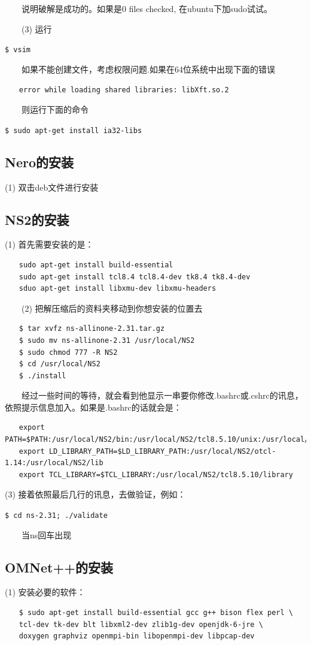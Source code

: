 　　说明破解是成功的。如果是0 files checked,  在ubuntu下加sudo试试。

　　(3) 运行

\verb"$ vsim"

　　如果不能创建文件，考虑权限问题.如果在64位系统中出现下面的错误

\verb"　　error while loading shared libraries: libXft.so.2"

　　则运行下面的命令

\verb"$ sudo apt-get install ia32-libs"

\subsection{Nero的安装}

(1) 双击deb文件进行安装

\subsection{NS2的安装}
(1) 首先需要安装的是：
\begin{verbatim}
　　sudo apt-get install build-essential
　　sudo apt-get install tcl8.4 tcl8.4-dev tk8.4 tk8.4-dev
　　sduo apt-get install libxmu-dev libxmu-headers
\end{verbatim}

　　(2) 把解压缩后的资料夹移动到你想安装的位置去
\begin{verbatim}
　　$ tar xvfz ns-allinone-2.31.tar.gz
　　$ sudo mv ns-allinone-2.31 /usr/local/NS2
　　$ sudo chmod 777 -R NS2
　　$ cd /usr/local/NS2
　　$ ./install
\end{verbatim}

　　经过一些时间的等待，就会看到他显示一串要你修改.bashrc或.cshrc的讯息，依照提示信息加入。如果是.bashrc的话就会是：
\begin{verbatim}
　　export PATH=$PATH:/usr/local/NS2/bin:/usr/local/NS2/tcl8.5.10/unix:/usr/local/NS2/tk8.5.10/unix
　　export LD_LIBRARY_PATH=$LD_LIBRARY_PATH:/usr/local/NS2/otcl-1.14:/usr/local/NS2/lib
　　export TCL_LIBRARY=$TCL_LIBRARY:/usr/local/NS2/tcl8.5.10/library
\end{verbatim}

(3) 接着依照最后几行的讯息，去做验证，例如：

\verb"$ cd ns-2.31; ./validate"

　　当ns回车出现%

\subsection{OMNet++的安装}
(1) 安装必要的软件：
\begin{verbatim}
　　$ sudo apt-get install build-essential gcc g++ bison flex perl \      
　　tcl-dev tk-dev blt libxml2-dev zlib1g-dev openjdk-6-jre \      
　　doxygen graphviz openmpi-bin libopenmpi-dev libpcap-dev
\end{verbatim}

